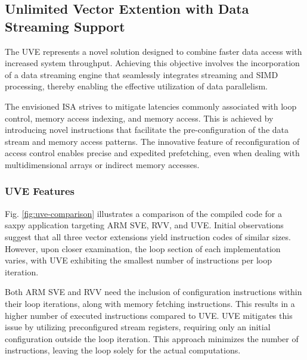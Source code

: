 \subsection{Unlimited Vector Extention with Data Streaming Support}
\label{label:uve}





The \acrfull{UVE} \cite{uve-paper} represents a novel solution designed to combine faster data access with increased system throughput. Achieving this objective involves the incorporation of a data streaming engine that seamlessly integrates streaming and SIMD processing, thereby enabling the effective utilization of data parallelism.

The envisioned \acrshort{ISA} strives to mitigate latencies commonly associated with loop control, memory access indexing, and memory access. This is achieved by introducing novel instructions that facilitate the pre-configuration of the data stream and memory access patterns. The innovative feature of reconfiguration of access control enables precise and expedited prefetching, even when dealing with multidimensional arrays or indirect memory accesses.


\subsubsection{UVE Features}


Fig. \ref{fig:uve-comparison} illustrates a comparison of the compiled code for a saxpy application targeting ARM SVE, RVV, and UVE. Initial observations suggest that all three vector extensions yield instruction codes of similar sizes. However, upon closer examination, the loop section of each implementation varies, with UVE exhibiting the smallest number of instructions per loop iteration.

Both ARM SVE and RVV need the inclusion of configuration instructions within their loop iterations, along with memory fetching instructions. This results in a higher number of executed instructions compared to UVE. UVE mitigates this issue by utilizing preconfigured stream registers, requiring only an initial configuration outside the loop iteration. This approach minimizes the number of instructions, leaving the loop solely for the actual computations.

